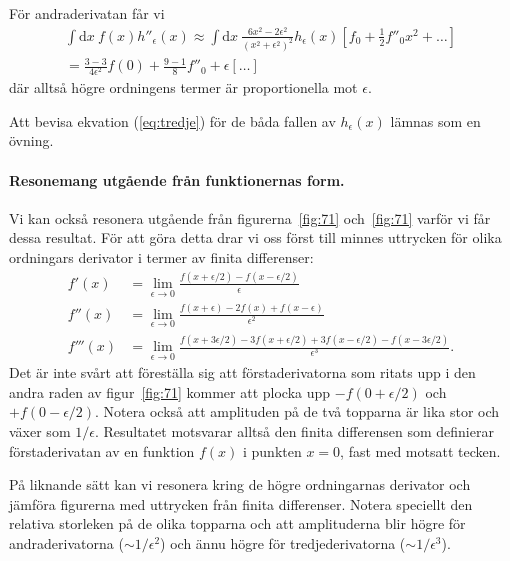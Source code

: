\documentclass[%
oneside,                 %
final,                   %
10pt]{article}
\newenvironment{doconceexercise}{}{}
\begin{document}
\begin{doconceexercise}
För andraderivatan får vi
\begin{gather}
    \int\mathrm dx\ f(x)h''_\epsilon(x)\approx\int\mathrm dx\ \frac{6x^2-2\epsilon^2}{\left(x^2+\epsilon^2\right)^2}h_\epsilon(x)\left[f_0+\frac12f''_0x^2+\ldots\right] \nonumber\\
    =\frac{3-3}{4\epsilon^2}f(0)+\frac{9-1}8f''_0 + \epsilon [\ldots]
\end{gather}
där alltså högre ordningens termer är proportionella mot $\epsilon$.

Att bevisa ekvation (\ref{eq:tredje}) för de båda fallen av $h_\epsilon(x)$ lämnas som en övning.

\paragraph{Resonemang utgående från funktionernas form.}
Vi kan också resonera utgående från figurerna~\ref{fig:71} och~\ref{fig:71} varför vi får dessa resultat. För att göra detta drar vi oss först till minnes uttrycken för olika ordningars derivator i termer av finita differenser:
\begin{align}
f'(x) &= \lim_{\epsilon \to 0} \frac{f(x+\epsilon/2)-f(x-\epsilon/2)}{\epsilon} \\
f''(x) &= \lim_{\epsilon \to 0} \frac{f(x+\epsilon)-2f(x)+f(x-\epsilon)}{\epsilon^2} \\
f'''(x) &= \lim_{\epsilon \to 0} \frac{f(x+3\epsilon/2)-3f(x+\epsilon/2)+3f(x-\epsilon/2)-f(x-3\epsilon/2)}{\epsilon^3}.
\end{align}
Det är inte svårt att föreställa sig att förstaderivatorna som ritats upp i den andra raden av figur~\ref{fig:71} kommer att plocka upp $-f(0+\epsilon/2)$ och $+f(0-\epsilon/2)$. Notera också att amplituden på de två topparna är lika stor och växer som $1/\epsilon$. Resultatet motsvarar alltså den finita differensen som definierar förstaderivatan av en funktion $f(x)$ i punkten $x=0$, fast med motsatt tecken.

På liknande sätt kan vi resonera kring de högre ordningarnas derivator och jämföra figurerna med uttrycken från finita differenser. Notera speciellt den relativa storleken på de olika topparna och att amplituderna blir högre för andraderivatorna ($\sim 1/\epsilon^2$) och ännu högre för tredjederivatorna ($\sim 1/\epsilon^3$).


\end{doconceexercise}



\end{document}

